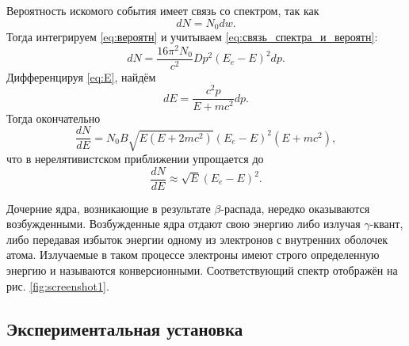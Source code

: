 \documentclass[a4paper, 12pt]{article}%
\newcommand{\gmm}{$\gamma $}
\newcommand{\btt}{$\beta $}
\begin{document}
	Вероятность искомого события имеет связь со спектром, так как
	\begin{equation}\label{eq:связь_спектра_и_вероятн}
		d N = N_0 d w.
	\end{equation}
	Тогда интегрируем \eqref{eq:вероятн} и учитываем \eqref{eq:связь_спектра_и_вероятн}:
	\begin{equation*}\label{eq:dN}
		d N = \dfrac{16 \pi^2 N_0}{c^2} D p^2 \left(E_e - E\right)^2 d p.
	\end{equation*}
	Дифференцируя \eqref{eq:E}, найдём
	\begin{equation*}\label{key}
		d E = \dfrac{c^2 p}{E+m c^2}d p.
	\end{equation*}
	Тогда окончательно
	\begin{equation}\label{eq:spectre}
		\dfrac{d N}{d E} = N_0 B \sqrt{E\left(E+2 m c^2\right)}\left(E_e-E\right)^2\left(E+m c^2\right), 
	\end{equation}
	что в нерелятивистском приближении упрощается до 
	\begin{equation}\label{eq:simpleSpectre}
		\dfrac{d N}{d E} \approx \sqrt{E} \left(E_e - E\right)^2.
	\end{equation}
	
	Дочерние ядра, возникающие в результате \btt-распада, нередко оказываются возбужденными. Возбужденные ядра отдают свою энергию	либо излучая \gmm-квант, либо передавая избыток энергии одному из электронов с внутренних оболочек атома. Излучаемые в таком	процессе электроны имеют строго определенную энергию и называются конверсионными.
	Соответствующий спектр отображён на рис. \ref{fig:screenshot1}.
		
	\subsection{Экспериментальная установка}
		
\end{document}
